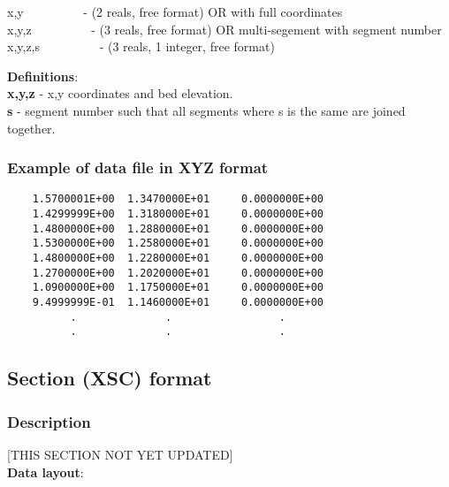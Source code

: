\documentclass{article}
\begin{document}
\noindent
x,y \ \ \ \ \ \ \ \ \ {}- (2 reals, free format)\newline
OR with full coordinates \\
x,y,z \ \ \ \ \ \ \ \ \ {}- (3 reals, free format)\newline
OR multi-segement with segment number \\
x,y,z,s \ \ \ \ \ \ \ \ \ {}- (3 reals, 1 integer, free format)\newline

\noindent\textbf{Definitions}:\\ 

\noindent
\textbf{x,y,z} - x,y coordinates and bed elevation. \\
\textbf{s} - segment number such that all segments where s is the same are joined together. \\


\subsubsection{Example of data file in XYZ format}

\begin{small}
\begin{lstlisting}
    1.5700001E+00  1.3470000E+01     0.0000000E+00   
    1.4299999E+00  1.3180000E+01     0.0000000E+00   
    1.4800000E+00  1.2880000E+01     0.0000000E+00   
    1.5300000E+00  1.2580000E+01     0.0000000E+00   
    1.4800000E+00  1.2280000E+01     0.0000000E+00   
    1.2700000E+00  1.2020000E+01     0.0000000E+00   
    1.0900000E+00  1.1750000E+01     0.0000000E+00   
    9.4999999E-01  1.1460000E+01     0.0000000E+00   
          .              .                 .     
          .              .                 .    
\end{lstlisting}
\end{small}

\newpage
\subsection[Section (XSC) format]{Section (XSC) format}

\subsubsection[Description]{Description}

[THIS SECTION NOT YET UPDATED]\\

\textbf{Data layout}: \\ 
\end{document}
